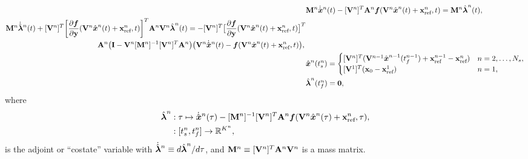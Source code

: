 \begin{align}\label{eq:lspg_continuous} 
&\massArg{n}   \genstateDotArg{n}{t}  -  [\basisspaceArg{n}]^T
\stweightingMatArgt{n}{t} \velocity(\veloargsromn) =  \massArg{n} \adjointArg{n}{t} , \\
\begin{split}
 &\massArg{n}  \adjointDotArg{n}{t}  + [\basisspaceArg{n}]^T \bigg[\frac{\partial
\velocity}{\partial \stateyDiscrete} (\veloargsromn) \bigg]^T \stweightingMatArgt{n}{t} \basisspaceArg{n}
 \adjointArg{n}{t} = -[\basisspaceArg{n}]^T \big[
\frac{\partial \velocity}{\partial \stateyDiscrete}(\veloargsromn) \big]^T \\& \hspace{1.7 in} \stweightingMatArgt{n}{t} \big( \mathbf{I} -
\basisspaceArg{n} [\massArg{n}]^{-1} [\basisspaceArg{n}]^T \stweightingMatArgt{n}{t} \big)
 \big( \basisspaceArg{n} \genstateDotArg{n}{t} -
\velocity(\veloargsromn) \big), \label{eq:lspg_adjoint}
\end{split}
 \\ &
\genstateArg{n}{\timeStartArg{n}} = \begin{cases}
\spatialIC & n=2,\ldots,\nslabs, \label{eq:lspg_bcs1}\\
\genstateICOne & n=1, \end{cases}\\ &
\adjointArg{n}{\timeEndArg{n}} = \boldsymbol 0, \label{eq:lspg_bcs} 
\end{align}
where 
\begin{equation}\label{eq:costate_def}
\begin{split}
\hat{\boldsymbol \lambda}^{n} &: \tau \mapsto \dot{\hat{ \boldsymbol x}}^{n}(\tau)  -  [\mathbf{M}^{n}]^{-1} [\mathbf {V}^{n}]^T \mathbf{A}^{n}\boldsymbol f(\mathbf {V}^{n} \hat{ \boldsymbol x}^{n}(\tau) + \mathbf{x}_\text{ref}^{n} , \tau ) ,\\
&: [t_s^{n},t_f^{n}] \rightarrow \mathbb{R}^{K^{n}} ,
\end{split}
\end{equation}
is the adjoint or ``costate'' variable with $\dot{\hat{\boldsymbol \lambda}}^{n} \equiv d \hat{\boldsymbol \lambda}^{n}/ d\tau$, and $\mathbf{M}^{n} \equiv [\mathbf {V}^{n}]^T \mathbf{A}^{n} \mathbf {V}^{n}$ is a mass matrix. 
